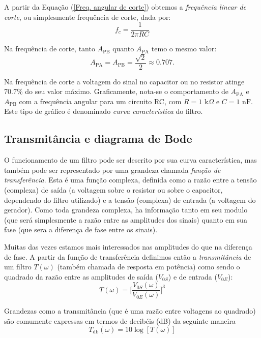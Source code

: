 \documentclass[letterpaper, 12pt]{article}
\begin{document}
A partir da Equação (\ref{Freq. angular de corte}) obtemos a \textit{frequência linear de corte}, ou simplesmente frequência de corte, dada por:
\begin{equation}\label{Freq. linear de corte}
    f_{c}=\frac{1}{2\pi RC}
\end{equation}

Na frequência de corte, tanto $A_{\text{PB}}$ quanto $A_{\text{PA}}$ temo o mesmo valor:
\begin{equation}\label{0.707}
    A_{\text{PA}}=A_{\text{PB}}=\frac{\sqrt{2}}{2}\approx0.707.
\end{equation}

Na frequência de corte a voltagem do sinal no capacitor ou no resistor atinge 70.7\% do seu valor máximo. Graficamente, nota-se o comportamento de $A_{\text{PA}}$ e $A_{\text{PB}}$ com a frequência angular para um circuito RC, com $R=1\text{ k}\Omega$ e $C=1\text{ nF}$. Este tipo de gráfico é denominado \textit{curva característica} do filtro.


\subsection{Transmitância e diagrama de Bode}
O funcionamento de um filtro pode ser descrito por sua curva característica, mas também
pode ser representado por uma grandeza chamada \textit{função de transferência}. Esta é uma função complexa, definida como a razão entre a tensão (complexa) de saída (a voltagem sobre o resistor ou sobre o capacitor, dependendo do filtro utilizado) e a tensão (complexa) de entrada (a voltagem do gerador). Como toda grandeza complexa, ha informação tanto em seu modulo (que será simplesmente a razão entre as amplitudes dos sinais) quanto em sua fase (que sera a diferença de fase entre os sinais).

Muitas das vezes estamos mais interessados nas amplitudes do que na diferença de
fase. A partir da função de transferência definimos então a \textit{transmitância} de um filtro $T(\omega)$ (também chamada de resposta em potência) como sendo o quadrado da razão entre as amplitudes de saída ($V_{0S}$) e de entrada ($V_{0E}$):
\begin{equation}\label{T(omega)}
    T(\omega)=\Bigg[\frac{V_{0S}(\omega)}{V_{0E}(\omega)}\Bigg]^{3}
\end{equation}

Grandezas como a transmitância (que é uma razão entre voltagens ao quadrado) são comumente expressas em termos de decibéis (dB) da seguinte maneira
\begin{equation}\label{Transmitância - dB}
    T_{\text{db}}(\omega)=10\log{[T(\omega)]}
\end{equation}
\end{document}

